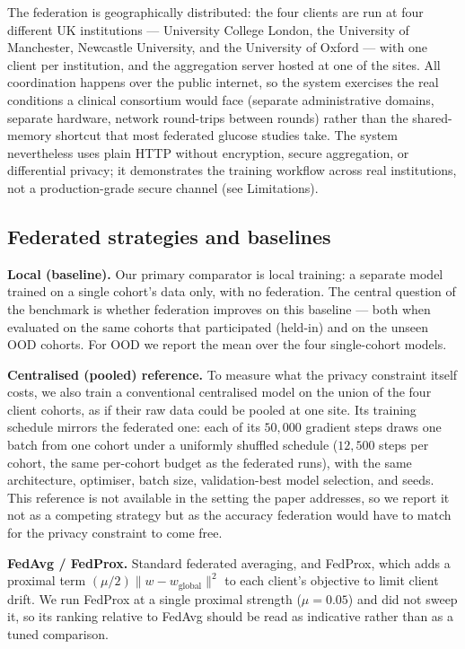 \documentclass[10pt,letterpaper]{article}
\begin{document}
The federation is geographically distributed: the four clients are run at four different UK institutions --- University College
London, the University of Manchester, Newcastle University, and the University of
Oxford --- with one client per institution, and the aggregation server hosted at one of the sites. All coordination happens
over the public internet, so the system exercises the real conditions a clinical
consortium would face (separate administrative domains, separate hardware,
network round-trips between rounds) rather than the shared-memory shortcut that
most federated glucose studies take. The system nevertheless uses plain HTTP
without encryption, secure aggregation, or differential privacy; it demonstrates
the training workflow across real institutions, not a production-grade secure
channel (see Limitations).

\subsection*{Federated strategies and baselines}

\textbf{Local (baseline).} Our primary comparator is local training: a separate
model trained on a single cohort's data only, with no federation. The central
question of the benchmark is whether federation improves on this baseline ---
both when evaluated on the same cohorts that participated (held-in) and on the
unseen OOD cohorts. For OOD we report the mean over the four single-cohort models.

\textbf{Centralised (pooled) reference.} To measure what the privacy constraint
itself costs, we also train a conventional centralised model on the union of the
four client cohorts, as if their raw data could be pooled at one site. Its
training schedule mirrors the federated one: each of its $50{,}000$ gradient
steps draws one batch from one cohort under a uniformly shuffled schedule
($12{,}500$ steps per cohort, the same per-cohort budget as the federated runs),
with the same architecture, optimiser, batch size, validation-best model
selection, and seeds. This reference is not available in the setting the paper
addresses, so we
report it not as a competing strategy but as the accuracy federation would have
to match for the privacy constraint to come free.

\textbf{FedAvg / FedProx.} Standard federated averaging, and FedProx, which adds
a proximal term $(\mu/2)\lVert w - w_{\text{global}}\rVert^2$ to each client's
objective to limit client drift. We run FedProx at a single proximal strength
($\mu=0.05$) and did not sweep it, so its ranking relative to FedAvg should be
read as indicative rather than as a tuned comparison.
\end{document}
